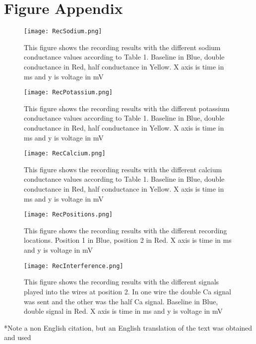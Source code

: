 \documentclass[12pt]{article}
\begin{document}
\section{Figure Appendix}
\begin{figure}[H]
	\centering
	\centering
	\texttt{[image: RecSodium.png]}
	
	\caption{This figure shows the recording results with the different sodium conductance values according to Table 1. Baseline in Blue, double conductance in Red, half conductance in Yellow. X axis is time in ms and y is voltage in mV  }
	\label{fig:recNa}
\end{figure}
\begin{figure}[H]
	\centering
	\centering
	\texttt{[image: RecPotassium.png]}
	
	\caption{This figure shows the recording results with the different potassium conductance values according to Table 1. Baseline in Blue, double conductance in Red, half conductance in Yellow. X axis is time in ms and y is voltage in mV  }
	\label{fig:recK}
\end{figure}
\begin{figure}[H]
	\centering
	\centering
	\texttt{[image: RecCalcium.png]}
	
	\caption{This figure shows the recording results with the different calcium conductance values according to Table 1. Baseline in Blue, double conductance in Red, half conductance in Yellow. X axis is time in ms and y is voltage in mV }
	\label{fig:recCa}
\end{figure}
\begin{figure}[H]
	\centering
	\centering
	\texttt{[image: RecPositions.png]}
	
	\caption{This figure shows the recording results with the different recording locations.  Position 1 in Blue, position 2 in Red. X axis is time in ms and y is voltage in mV}
	\label{fig:recPos}
\end{figure}
\begin{figure}[H]
	\centering
	\centering
	\texttt{[image: RecInterference.png]}
	
	\caption{This figure shows the recording results with the different signals played into the wires at position 2. In one wire the double Ca signal was sent and the other was the half Ca signal. Baseline in Blue, double signal in Red. X axis is time in ms and y is voltage in mV }
	\label{fig:recInterfere}
\end{figure}




*Note a non English citation, but an English translation of the text was obtained and used
\end{document}
